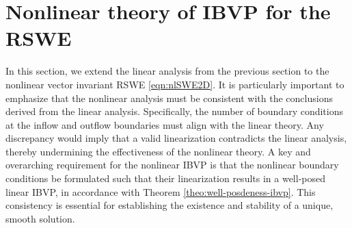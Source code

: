 \documentclass{article}
\numberwithin{equation}{section}
\theoremstyle{definition}
\begin{document}
\section{Nonlinear theory of IBVP for the RSWE}\label{sec:nonlinear-IBVP-RSWE}
In this section, we extend the linear analysis from the previous section to the nonlinear vector invariant RSWE \eqref{eqn:nlSWE2D}. It is particularly important to emphasize that the nonlinear analysis must be consistent with the conclusions derived from the linear analysis. Specifically, the number of boundary conditions at the inflow and outflow boundaries must align with the linear theory. Any discrepancy would imply that a valid linearization contradicts the linear analysis, thereby undermining the effectiveness of the nonlinear theory. 
%
A key and overarching requirement for the nonlinear IBVP is that the nonlinear boundary conditions be formulated such that their linearization results in a well-posed linear IBVP, in accordance with Theorem \ref{theo:well-posdeness-ibvp}. This consistency is essential for establishing the existence and stability of a unique, smooth solution.
\end{document}
